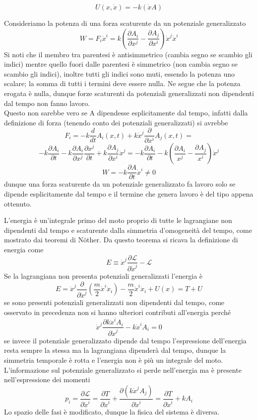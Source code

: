 \documentclass[
10pt, %
a4paper, %
oneside, %
headinclude,footinclude, %
BCOR5mm, %
]{scrartcl}
\begin{document}
\[U(x, \dot{x}) = -k(\dot{x}A)\]
\begin{osservazione}
	Consideriamo la potenza di una forza scaturente da un potenziale generalizzato
	\[W = F_i\dot{x}^i = k\left(\frac{\partial A_i}{\partial x^j}-\frac{\partial A_j}{\partial x^i}\right)\dot{x}^j\dot{x}^i\]
	Si noti che il membro tra parentesi è antisimmetrico (cambia segno se scambio gli indici) mentre quello fuori dalle parentesi è simmetrico (non cambia segno se scambio gli indici), inoltre tutti gli indici sono muti, essendo la potenza uno scalare; la somma di tutti i termini deve essere nulla. Ne segue che la potenza erogata è nulla, dunque forze scaturenti da potenziali generalizzati non dipendenti dal tempo non fanno lavoro.\\
	Questo non sarebbe vero se A dipendesse esplicitamente dal tempo, infatti dalla definizione di forza (tenendo conto dei potenziali generalizzati) si avrebbe
	\[F_i = -k\frac{d}{dt}A_i(x, t)+k\dot{x}^j\frac{\partial}{\partial x^i}A_j(x, t) =\]
	\[-k\frac{\partial A_i}{\partial t} -k\frac{\partial A_i}{\partial x^j}\frac{\partial x^j}{\partial t}+k\frac{\partial A_j}{\partial x^i}\dot{x}^j = -k\frac{\partial A_i}{\partial t} -k\left(\frac{\partial A_i}{x^j}-\frac{\partial A_j}{x^i}\right)\dot{x}^j\]
	\[W = -k\frac{\partial A}{\partial t}\dot{x}^i\neq 0\]
	dunque una forza scaturente da un potenziale generalizzato fa lavoro solo se dipende esplicitamente dal tempo e il termine che genera lavoro è del tipo appena ottenuto.
\end{osservazione}
\begin{osservazione}
	L'energia è un'integrale primo del moto proprio di tutte le lagrangiane non dipendenti dal tempo e scaturente dalla simmetria d'omogeneità del tempo, come mostrato dai teoremi di  N\"{o}ther. Da questo teorema si ricava la definizione di energia come
	\[E \equiv \dot{x}^j\frac{\partial \mathcal{L}}{\partial \dot{x}^j}-\mathcal{L}\]
	Se la lagrangiana non presenta potenziali generalizzati l'energia è
	\[E = \dot{x}^j\frac{\partial }{\partial \dot{x}^j}(\frac{m}{2}\dot{x}^i\dot{x}_i)-\frac{m}{2}\dot{x}^i\dot{x}_i+U(x) = T + U\]
	se sono presenti potenziali generalizzati non dipendenti dal tempo, come osservato in precedenza non si hanno ulteriori contributi all'energia perché 
	\[\dot{x}^j\frac{\partial k\dot{x}^iA_i}{\partial \dot{x}^j}-k\dot{x}^iA_i = 0\]
	se invece il potenziale generalizzato dipende dal tempo l'espressione dell'energia resta sempre la stessa ma la lagrangiana dipenderà dal tempo, dunque la simmetria temporale è rotta e l'energia non è più un integrale del moto. L'informazione sul potenziale generalizzato si perde nell'energia ma è presente nell'espressione dei momenti 
	\[p_i = \frac{\partial \mathcal{L}}{\partial \dot{x}^i} = \frac{\partial T}{\partial \dot{x}^i}+\frac{\partial (k\dot{x}^jA_j)}{\partial \dot{x}^i} = \frac{\partial T}{\partial \dot{x}^i} + kA_i\]
	Lo spazio delle fasi è modificato, dunque la fisica del sistema è diversa. 
\end{osservazione}
\end{document}
